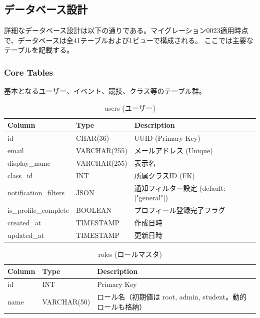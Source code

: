 \documentclass[paper=a4, fontsize=11pt]{jlreq}
\begin{document}
\subsection{データベース設計}
詳細なデータベース設計は以下の通りである。マイグレーション0023適用時点で、データベースは全41テーブルおよび1ビューで構成される。
ここでは主要なテーブルを記載する。

\subsubsection{Core Tables}
基本となるユーザー、イベント、競技、クラス等のテーブル群。

\begin{table}[H]
    \centering
    \caption{users (ユーザー)}
    \begin{tabularx}{\textwidth}{|l|l|X|}
        \toprule
        Column & Type & Description \\
        \midrule
        id & CHAR(36) & UUID (Primary Key) \\
        email & VARCHAR(255) & メールアドレス (Unique) \\
        display\_name & VARCHAR(255) & 表示名 \\
        class\_id & INT & 所属クラスID (FK) \\
        notification\_filters & JSON & 通知フィルター設定 (default: ["general"]) \\
        is\_profile\_complete & BOOLEAN & プロフィール登録完了フラグ \\
        created\_at & TIMESTAMP & 作成日時 \\
        updated\_at & TIMESTAMP & 更新日時 \\
        \bottomrule
    \end{tabularx}
\end{table}

\begin{table}[H]
    \centering
    \caption{roles (ロールマスタ)}
    \begin{tabularx}{\textwidth}{|l|l|X|}
        \toprule
        Column & Type & Description \\
        \midrule
        id & INT & Primary Key \\
        name & VARCHAR(50) & ロール名（初期値は root, admin, student。動的ロールも格納） \\
        \bottomrule
    \end{tabularx}
\end{table}
\end{document}
